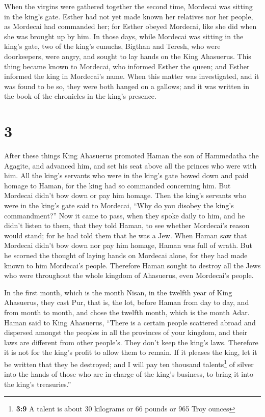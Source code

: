  When the virgins were gathered together the second time,
Mordecai was sitting in the king's gate.  Esther had not
yet made known her relatives nor her people, as Mordecai had commanded
her; for Esther obeyed Mordecai, like she did when she was brought up by
him.  In those days, while Mordecai was sitting in the
king's gate, two of the king's eunuchs, Bigthan and Teresh, who were
doorkeepers, were angry, and sought to lay hands on the King Ahasuerus.
 This thing became known to Mordecai, who informed Esther
the queen; and Esther informed the king in Mordecai's name.
 When this matter was investigated, and it was found to
be so, they were both hanged on a gallows; and it was written in the
book of the chronicles in the king's presence.

\hypertarget{section-2}{%
\section{3}\label{section-2}}

 After these things King Ahasuerus promoted Haman the son
of Hammedatha the Agagite, and advanced him, and set his seat above all
the princes who were with him.  All the king's servants
who were in the king's gate bowed down and paid homage to Haman, for the
king had so commanded concerning him. But Mordecai didn't bow down or
pay him homage.  Then the king's servants who were in the
king's gate said to Mordecai, ``Why do you disobey the king's
commandment?''  Now it came to pass, when they spoke daily
to him, and he didn't listen to them, that they told Haman, to see
whether Mordecai's reason would stand; for he had told them that he was
a Jew.  When Haman saw that Mordecai didn't bow down nor
pay him homage, Haman was full of wrath.  But he scorned
the thought of laying hands on Mordecai alone, for they had made known
to him Mordecai's people. Therefore Haman sought to destroy all the Jews
who were throughout the whole kingdom of Ahasuerus, even Mordecai's
people.

 In the first month, which is the month Nisan, in the
twelfth year of King Ahasuerus, they cast Pur, that is, the lot, before
Haman from day to day, and from month to month, and chose the twelfth
month, which is the month Adar.  Haman said to King
Ahasuerus, ``There is a certain people scattered abroad and dispersed
amongst the peoples in all the provinces of your kingdom, and their laws
are different from other people's. They don't keep the king's laws.
Therefore it is not for the king's profit to allow them to remain.
 If it pleases the king, let it be written that they be
destroyed; and I will pay ten thousand talents\footnote{\textbf{3:9} A
  talent is about 30 kilograms or 66 pounds or 965 Troy ounces} of
silver into the hands of those who are in charge of the king's business,
to bring it into the king's treasuries.''

